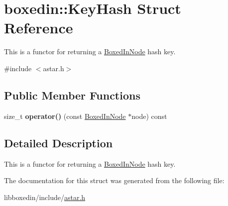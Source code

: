 \hypertarget{structboxedin_1_1KeyHash}{\section{boxedin\+:\+:Key\+Hash Struct Reference}
\label{structboxedin_1_1KeyHash}
}


This is a functor for returning a \hyperlink{classboxedin_1_1BoxedInNode}{Boxed\+In\+Node} hash key.  




{\ttfamily \#include $<$astar.\+h$>$}

\subsection*{Public Member Functions}
\begin{DoxyCompactItemize}
\item 
\hypertarget{structboxedin_1_1KeyHash_a40ffdcf639731094ee2fa20fa92b720a}{size\+\_\+t {\bfseries operator()} (const \hyperlink{classboxedin_1_1BoxedInNode}{Boxed\+In\+Node} $\ast$node) const }\label{structboxedin_1_1KeyHash_a40ffdcf639731094ee2fa20fa92b720a}

\end{DoxyCompactItemize}


\subsection{Detailed Description}
This is a functor for returning a \hyperlink{classboxedin_1_1BoxedInNode}{Boxed\+In\+Node} hash key. 

The documentation for this struct was generated from the following file\+:\begin{DoxyCompactItemize}
\item 
libboxedin/include/\hyperlink{astar_8h}{astar.\+h}\end{DoxyCompactItemize}
